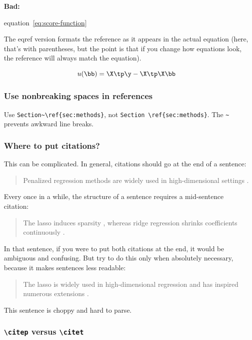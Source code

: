 \documentclass{article}
\newcommand{\xmark}{\textcolor{red}{\faXmark}}
\newcommand{\bad}{\xmark\; \textbf{Bad:}}
\begin{document}
\bad

\begin{LTXexample}
equation~\ref{eq:score-function}
\end{LTXexample}

The eqref version formats the reference as it appears in the actual equation (here, that's with parentheses, but the point is that if you change how equations look, the reference will always match the equation).

\begin{equation}
  \label{eq:score-function}
  u(\bb) = \X \tp \y - \X \tp \X \bb
\end{equation}

\subsubsection*{Use nonbreaking spaces in references}

Use \verb|Section~\ref{sec:methods}|, not \verb|Section \ref{sec:methods}|. The \verb|~| prevents awkward line breaks.

\subsubsection*{Where to put citations?}

This can be complicated. In general, citations should go at the end of a sentence:
\begin{quote}
Penalized regression methods are widely used in high-dimensional settings \citep{Hastie2009,Zou2005}.  
\end{quote}
Every once in a while, the structure of a sentence requires a mid-sentence citation:
\begin{quote}
The lasso induces sparsity \citep{Tibshirani1996}, whereas ridge regression shrinks coefficients continuously \citep{Hoerl1970}.  
\end{quote}
In that sentence, if you were to put both citations at the end, it would be ambiguous and confusing. But try to do this only when absolutely necessary, because it makes sentences less readable:
\begin{quote}
The lasso \citep{Tibshirani1996} is widely used in high-dimensional regression \citep{Hastie2009} and has inspired numerous extensions \citep{Zou2005,Fan2001}.  
\end{quote}
This sentence is choppy and hard to parse.

\subsubsection*{\texttt{\textbackslash citep} versus \texttt{\textbackslash citet}}
\end{document}
